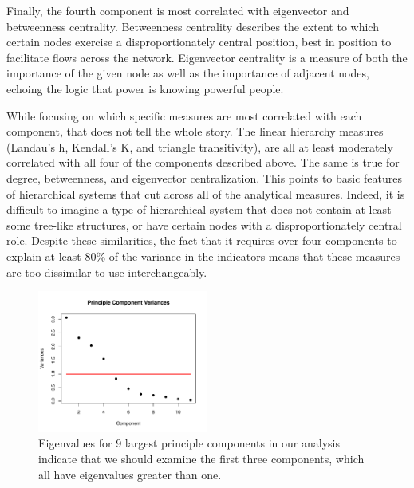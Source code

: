 \documentclass[3p,times]{elsarticle}
\begin{document}
Finally, the fourth component is most correlated with eigenvector and betweenness centrality. Betweenness centrality describes the extent to which certain nodes exercise a disproportionately central position, best in position to facilitate flows across the network. Eigenvector centrality is a measure of both the importance of the given node as well as the importance of adjacent nodes, echoing the logic that power is knowing powerful people.

While focusing on which specific measures are most correlated with each component, that does not tell the whole story. The linear hierarchy measures (Landau's h, Kendall's K, and triangle transitivity), are all at least moderately correlated with all four of the components described above. The same is true for degree, betweenness, and eigenvector centralization. This points to basic features of hierarchical systems that cut across all of the analytical measures. Indeed, it is difficult to imagine a type of hierarchical system that does not contain at least some tree-like structures, or have certain nodes with a disproportionately central role. Despite these similarities, the fact that it requires over four components to explain at least 80\% of the variance in the indicators means that these measures are too dissimilar to use interchangeably.

\begin{figure}
\begin{center}
	\caption{\label{fig:PCA variacnes} Eigenvalues for 9 largest principle components in our analysis indicate that we should examine the first three components, which all have eigenvalues greater than one.}
		\includegraphics[width = 0.5\textwidth]{./images/Observed_PCA_Component_Varinces.pdf}
\end{center}
\end{figure}
\end{document}
